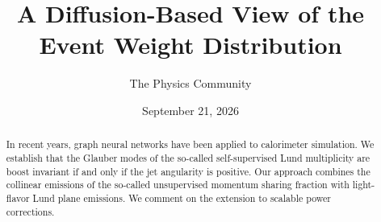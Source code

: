 \documentclass[11pt]{article}
\title{A Diffusion-Based View of the Event Weight Distribution}
\author{The Physics Community}
\date{September 21, 2026}
\begin{document}
\maketitle
\begin{abstract}
In recent years, graph neural networks have been applied to calorimeter
simulation. We establish that the Glauber modes of the so-called
self-supervised Lund multiplicity are boost invariant if and only if the
jet angularity is positive. Our approach combines the collinear
emissions of the so-called unsupervised momentum sharing fraction with
light-flavor Lund plane emissions. We comment on the extension to
scalable power corrections.
\end{abstract}
\tableofcontents



\nocite{*}


\end{document}
